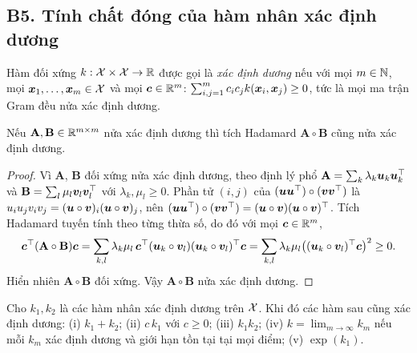 \subsection{B5. Tính chất đóng của hàm nhân xác định dương}\label{sec:B5}

\begin{definition}\label{def:B5-pd}
Hàm đối xứng $k : \mathcal{X} \times \mathcal{X} \to \mathbb{R}$ được gọi là \emph{xác định dương} nếu với mọi
$m \in \mathbb{N}$, mọi $\bm{x}_1, \dots, \bm{x}_m \in \mathcal{X}$ và mọi $\bm{c} \in \mathbb{R}^m$:
$\sum_{i,j=1}^m c_i c_j k(\bm{x}_i, \bm{x}_j) \ge 0$, tức là mọi ma trận Gram đều nửa xác định dương.
\end{definition}

\begin{lemma}\label{lem:B5-schur}
Nếu $\mathbf{A}, \mathbf{B} \in \mathbb{R}^{m \times m}$ nửa xác định dương thì tích Hadamard
$\mathbf{A} \circ \mathbf{B}$ cũng nửa xác định dương.
\end{lemma}

\begin{proof}
Vì $\mathbf{A}$, $\mathbf{B}$ đối xứng nửa xác định dương, theo định lý phổ
$\mathbf{A} = \sum_k \lambda_k \bm{u}_k\bm{u}_k^{\top}$ và $\mathbf{B} = \sum_l \mu_l \bm{v}_l\bm{v}_l^{\top}$ với
$\lambda_k, \mu_l \ge 0$. Phần tử $(i, j)$ của $(\bm{u}\bm{u}^{\top}) \circ (\bm{v}\bm{v}^{\top})$ là
$u_i u_j v_i v_j = (\bm{u} \circ \bm{v})_i (\bm{u} \circ \bm{v})_j$, nên
$(\bm{u}\bm{u}^{\top}) \circ (\bm{v}\bm{v}^{\top}) = (\bm{u} \circ \bm{v})(\bm{u} \circ \bm{v})^{\top}$. Tích Hadamard
tuyến tính theo từng thừa số, do đó với mọi $\bm{c} \in \mathbb{R}^m$,
\[
  \bm{c}^{\top}(\mathbf{A} \circ \mathbf{B})\bm{c}
  = \sum_{k,l} \lambda_k \mu_l\, \bm{c}^{\top}(\bm{u}_k \circ \bm{v}_l)(\bm{u}_k \circ \bm{v}_l)^{\top}\bm{c}
  = \sum_{k,l} \lambda_k \mu_l \bigl((\bm{u}_k \circ \bm{v}_l)^{\top}\bm{c}\bigr)^2 \ge 0.
\]
Hiển nhiên $\mathbf{A} \circ \mathbf{B}$ đối xứng. Vậy $\mathbf{A} \circ \mathbf{B}$ nửa xác định dương.
\end{proof}

\begin{proposition}\label{prop:B5-closure}
Cho $k_1, k_2$ là các hàm nhân xác định dương trên $\mathcal{X}$. Khi đó các hàm sau cũng
xác định dương: (i) $k_1 + k_2$; (ii) $c\,k_1$ với $c \ge 0$; (iii) $k_1 k_2$;
(iv) $k = \lim_{m\to\infty} k_m$ nếu mỗi $k_m$ xác định dương và giới hạn tồn tại tại mọi điểm;
(v) $\exp(k_1)$.
\end{proposition}

